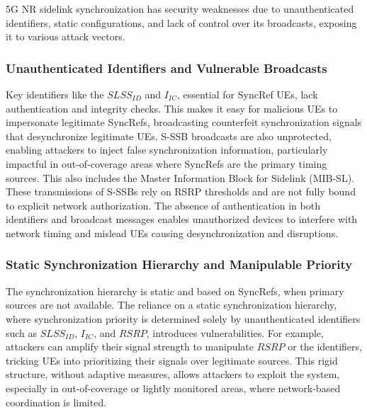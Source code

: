 5G NR sidelink synchronization has security weaknesses due to unauthenticated identifiers, static configurations, and lack of control over its broadcasts, exposing it to various attack vectors.

\subsubsection{Unauthenticated Identifiers and Vulnerable Broadcasts} Key identifiers like the $SLSS_{ID}$ and $I_{IC}$, essential for SyncRef UEs, lack authentication and integrity checks. This makes it easy for malicious UEs to impersonate legitimate SyncRefs, broadcasting counterfeit synchronization signals that desynchronize legitimate UEs. S-SSB broadcasts are also unprotected, enabling attackers to inject false synchronization information, particularly impactful in out-of-coverage areas where SyncRefs are the primary timing sources. This also includes the Master Information Block for Sidelink (MIB-SL). These transmissions of S-SSBs rely on RSRP thresholds and are not fully bound to explicit network authorization. The absence of authentication in both identifiers and broadcast messages enables unauthorized devices to interfere with network timing and mislead UEs causing desynchronization and disruptions.

\subsubsection{Static Synchronization Hierarchy and Manipulable Priority} The synchronization hierarchy is static and based on SyncRefs, when primary sources are not available. The reliance on a static synchronization hierarchy, where synchronization priority is determined solely by unauthenticated identifiers such as $SLSS_{ID}$, $I_{IC}$, and $RSRP$, introduces vulnerabilities. For example, attackers can amplify their signal strength to manipulate $RSRP$ or the identifiers, tricking UEs into prioritizing their signals over legitimate sources. This rigid structure, without adaptive measures, allows attackers to exploit the system, especially in out-of-coverage or lightly monitored areas, where network-based coordination is limited.

